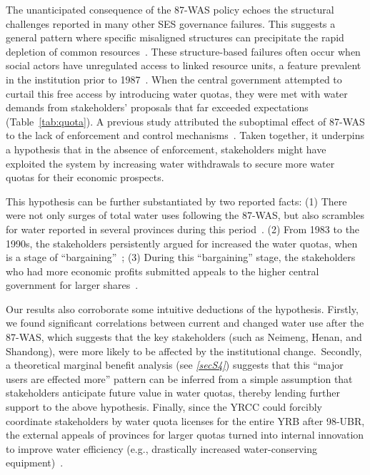 \documentclass[preprint, 12pt]{elsarticle}
\begin{document}
The unanticipated consequence of the 87-WAS policy echoes the structural challenges reported in many other SES governance failures.
This suggests a general pattern where specific misaligned structures can precipitate the rapid depletion of common resources~\cite{kellenberg2009,cai2016,barnes2019}.
These structure-based failures often occur when social actors have unregulated access to linked resource units, a feature prevalent in the institution prior to 1987~\cite{wang2019c}.
When the central government attempted to curtail this free access by introducing water quotas, they were met with water demands from stakeholders' proposals that far exceeded expectations (Table~\ref{tab:quota}).
A previous study attributed the suboptimal effect of 87-WAS to the lack of enforcement and control mechanisms~\cite{huangang2002}.
Taken together, it underpins a hypothesis that in the absence of enforcement, stakeholders might have exploited the system by increasing water withdrawals to secure more water quotas for their economic prospects.

This hypothesis can be further substantiated by two reported facts:
(1) There were not only surges of total water uses following the 87-WAS, but also scrambles for water reported in several provinces during this period~\cite{mao2000, bouckaert2022}.
(2) From 1983 to the 1990s, the stakeholders persistently argued for increased the water quotas, when is a stage of ``bargaining''~\cite{wang2019e, wang2019d};
(3) During this ``bargaining'' stage, the stakeholders who had more economic profits submitted appeals to the higher central government for larger shares~\cite{wang2019e, wang2019d}.

Our results also corroborate some intuitive deductions of the hypothesis.
Firstly, we found significant correlations between current and changed water use after the 87-WAS, which suggests that the key stakeholders (such as Neimeng, Henan, and Shandong), were more likely to be affected by the institutional change.\
Secondly, a theoretical marginal benefit analysis (see \textit{\ref{secS4}}) suggests that this ``major users are effected more'' pattern can be inferred from a simple assumption that stakeholders anticipate future value in water quotas, thereby lending further support to the above hypothesis.
Finally, since the YRCC could forcibly coordinate stakeholders by water quota licenses for the entire YRB after 98-UBR, the external appeals of provinces for larger quotas turned into internal innovation to improve water efficiency (e.g., drastically increased water-conserving equipment)~\cite{krieger1955, ostrom1990}.
\end{document}
